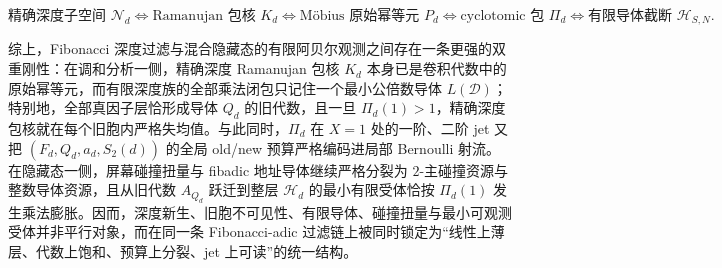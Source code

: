 \[
\boxed{\text{精确深度子空间 }\mathcal N_d}
\Longleftrightarrow
\boxed{\text{Ramanujan 包核 }K_d}
\Longleftrightarrow
\boxed{\text{M\"obius 原始幂等元 }P_d}
\Longleftrightarrow
\boxed{\text{cyclotomic 包 }\Pi_d}
\Longleftrightarrow
\boxed{\text{有限导体截断 }\mathcal H_{S,N}}.
\]

\noindent
综上，Fibonacci 深度过滤与混合隐藏态的有限阿贝尔观测之间存在一条更强的双重刚性：在调和分析一侧，精确深度 Ramanujan 包核 \(K_d\) 本身已是卷积代数中的原始幂等元，而有限深度族的全部乘法闭包只记住一个最小公倍数导体 \(L(\mathcal D)\)；特别地，全部真因子层恰形成导体 \(Q_d\) 的旧代数，且一旦 \(\Pi_d(1)>1\)，精确深度包核就在每个旧胞内严格失均值。与此同时，\(\Pi_d\) 在 \(X=1\) 处的一阶、二阶 jet 又把 \((F_d,Q_d,a_d,S_2(d))\) 的全局 old/new 预算严格编码进局部 Bernoulli 射流。 在隐藏态一侧，屏幕碰撞扭量与 fibadic 地址导体继续严格分裂为 \(2\)-主碰撞资源与整数导体资源，且从旧代数 \(A_{Q_d}\) 跃迁到整层 \(\mathcal H_d\) 的最小有限受体恰按 \(\Pi_d(1)\) 发生乘法膨胀。因而，深度新生、旧胞不可见性、有限导体、碰撞扭量与最小可观测受体并非平行对象，而在同一条 Fibonacci-adic 过滤链上被同时锁定为“线性上薄层、代数上饱和、预算上分裂、jet 上可读”的统一结构。

\endinput
